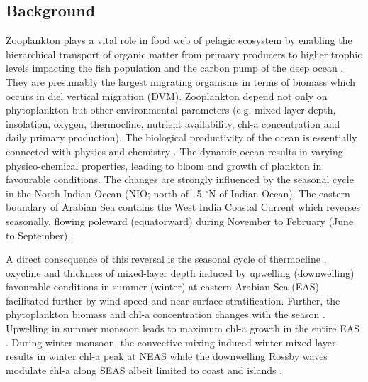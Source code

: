 \documentclass{article}
\begin{document}
	\subsection{Background}
	Zooplankton plays a vital role in food web of pelagic ecosystem by enabling the hierarchical transport of organic matter from primary producers to higher trophic levels impacting the fish population \citep{ohman2001density} and the carbon pump of the deep ocean \citep{le2016global}. They are presumably the largest migrating organisms in terms of biomass \citep{hays2003review} which occurs in diel vertical migration (DVM). Zooplankton depend not only on phytoplankton but other environmental parameters (e.g. mixed-layer depth, insolation, oxygen, thermocline, nutrient availability, chl-a concentration and daily primary production). The biological productivity of the ocean is essentially connected with physics and chemistry \citep{subrahmanyan1959studiespart2, ryther1966primary, qasim1977biological, nair1970primary,banse1995zooplankton,mccreary2009biophysical, vijith2016consequences,amol2020modulation}. The dynamic ocean results in varying physico-chemical properties, leading to bloom and growth of plankton in favourable conditions. The changes are strongly influenced by the seasonal cycle in the North Indian Ocean (NIO; north of ~5 $^{\circ}$N of Indian Ocean). The eastern boundary of Arabian Sea contains the West India Coastal Current \citep[WICC;][]{ramamirtham1965hydrography, banse1968hydrography, shetye1990hydrography,mccreary1993numerical, amol2014observed, vijith2016consequences, chaudhuri2020observed} which reverses seasonally, flowing poleward (equatorward) during November to February (June to September) \citep{shetye1990hydrography,shetye19911517,vijith2022circulation}. 
	
	A direct consequence of this reversal is the seasonal cycle of thermocline \citep{prasad1996mixed,prasannakumara20051848}, oxycline \citep{desousa1996seasonal,schmidt2020seasonal} and thickness of mixed-layer depth \citep[MLD;][]{shetye19911517,prasad1996mixed,prasannakumara20051848} induced by upwelling (downwelling) favourable conditions in summer (winter) at eastern Arabian Sea (EAS) facilitated further by wind speed and near-surface stratification. Further, the phytoplankton biomass and chl-a concentration changes with the season \citep{subrahmanyan1960studies, banse1968hydrography,prasannakumara20051848,levy2007basin, vijith2016consequences}. Upwelling in summer monsoon leads to maximum chl-a growth in the entire EAS \citep{banse1968hydrography, banse2000geographical, mccreary2009biophysical, hood2017biogeochemical,bemal2018picophytoplankton,shi2022phytoplankton}. During winter monsoon, the convective mixing induced winter mixed layer \citep{shetye1992does, madhupratap1996mechanism,mccreary1996four, levy2007basin,  shankar2016inhibition, vijith2016consequences, keerthi2017physical,shi2022phytoplankton} results in winter chl-a peak at NEAS while the downwelling Rossby waves modulate chl-a along SEAS albeit limited to coast and islands \citep{amol2020modulation}. 
	
\end{document}
